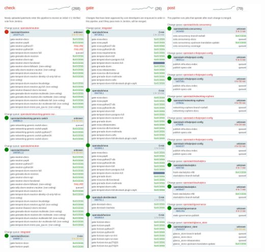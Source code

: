 \documentclass[aspectratio=169,11pt,hyperref={colorlinks=true}]{beamer}
\begin{document}
\begin{frame}
  \begin{center}
      \includegraphics[width=.8\textwidth]{ZuulStatus.png}
  \end{center}
\end{frame}
\end{document}
